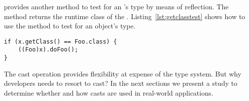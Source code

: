 \java{} provides another method to test for an 's type by means of reflection.
The  method returns the runtime class of the .
Listing~\ref{lst:getclasstest} shows how to use the  method to test for an object's type.

\begin{lstlisting}[style=java,label=lst:getclasstest,caption={Runtime type test using \code{getClass} before applying a cast.}]
if (x.getClass() == Foo.class) {
	((Foo)x).doFoo(); 
}
\end{lstlisting}

The cast operation provides flexibility at expense of the type system.
But why developers needs to resort to cast?
In the next sections we present a study to determine whether and how 
casts are used in real-world \java{} applications.







